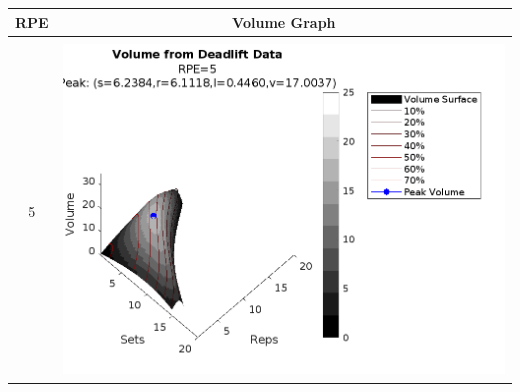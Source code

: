 \begin{table}[]
    \centering
    \begin{tabular}{c|c}
        RPE & Volume Graph \\%
        \hline \\
        
        5 &
        \includegraphics[width=139mm]{DeadliftVolume/5-1.png} \\%
        
        

\end{tabular}
\end{table}
